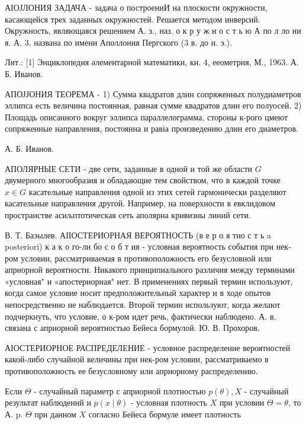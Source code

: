 \documentclass[10pt]{article}
\begin{document}
АІОЈЛОНИЯ ЗАДАЧА - задача о построениИ на плоскости окружности, касающейся трех заданных окружностей. Решается методом инверсий. Окружность, являющаяся решением А. з., наз. о к р у ж н о с т ь ю А по л ло ни я. А. 3. названа по имени Аполлония Пергского (3 в. до н. э.).



Лит.: [1] Энциклопедия әлементарной математики, кн. 4, ееометрия, М., 1963. А. Б. Иванов.



АПОЈЈОНИЯ ТЕОРЕМА - 1) Сумма квадратов длин сопряженных полудиаметров эллипса есть величина постоянная, равная сумме квадратов длин его полуосей. 2) Площадь описанного вокруг эллипса параллелограмма, стороны к-рого цмеют сопряженные направления, постоянна и равіа произведению длин его диаметров.



А. Б. Иванов.



АПОЛЯРНЫЕ СЕТИ - две сети, заданные в одной и той же области $G$ двумерного многообразия и обладающие тем свойством, что в каждой точке $x \in G$ касательные направления одной из этих сетей гармонически разделяют касательные направления другой. Например, на поверхности в евклидовом пространстве асиљптотическая сеть аполярна кривизны линий сети.



В. Т. Баэылев. АІІОСТЕРИОРНАЯ ВЕРОЯТНОСТЬ (в е р о я тно с т ь a posteriori) к а к о го-ли бо с о б т ия - условная вероятность события при нек-ром условии, рассматриваемая в противоположность его безусловной или априорной вероятности. Никакого принципиального различия между терминами «условная" и «апостериорная" нет. В применениях первый термин используют, когда самое уєловие носит предположительный характер и в ходе опытов непосредственно не наблюдается. Второй термин используют, когда желают подчеркнуть, что условие, о к-ром идет речь, фактически наблюдено. А. в. связана с априорной вероятностью Бейеса бормулой. Ю. В. Прохоров.



АІОСТЕРИОРНОЕ РАСПРЕДЕЛЕНИЕ - условное распределение вероятностей какой-либо случайной величины при нек-ром условии, рассматриваемо в противоположность ее безусловному или априорному распределению.



Если $\Theta$ - случайный параметр с априорной плотностью $p(\theta), X$ - случайный результат наблюдений и $p(x \mid \theta)$ - условная плотность $X$ при условии $\Theta=\theta$, то А. p. $\Theta$ при данном $X$ согласно Бейеса бормуле имеет плотность
\end{document}
